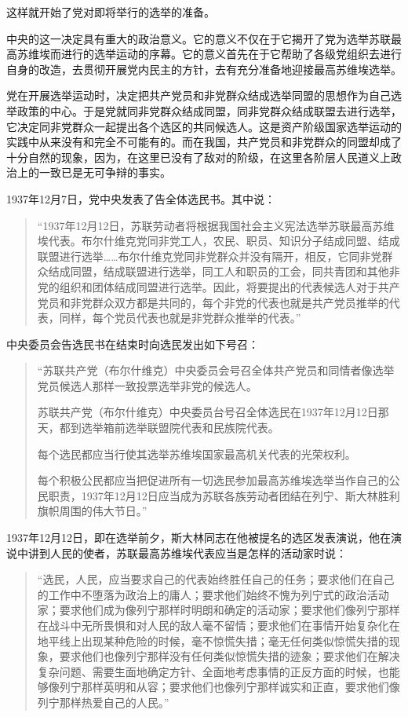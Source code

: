 这样就开始了党对即将举行的选举的准备。

中央的这一决定具有重大的政治意义。它的意义不仅在于它揭开了党为选举苏联最高苏维埃而进行的选举运动的序幕。它的意义首先在于它帮助了各级党组织去进行自身的改造，去贯彻开展党内民主的方针，去有充分准备地迎接最高苏维埃选举。

党在开展选举运动时，决定把共产党员和非党群众结成选举同盟的思想作为自己选举政策的中心。于是党就同非党群众结成同盟，同非党群众结成联盟去进行选举，它决定同非党群众一起提出各个选区的共同候选人。这是资产阶级国家选举运动的实践中从来没有和完全不可能有的。而在我国，共产党员和非党群众的同盟却成了十分自然的现象，因为，在这里已没有了敌对的阶级，在这里各阶层人民道义上政治上的一致已是无可争辩的事实。

1937年12月7日，党中央发表了告全体选民书。其中说：

\begin{quotation}
“1937年12月12日，苏联劳动者将根据我国社会主义宪法选举苏联最高苏维埃代表。布尔什维克党同非党工人，农民、职员、知识分子结成同盟、结成联盟进行选举……布尔什维克党同非党群众并没有隔开，相反，它同非党群众结成同盟，结成联盟进行选举，同工人和职员的工会，同共青团和其他非党的组织和团体结成同盟进行选举。因此，将要提出的代表候选人对于共产党员和非党群众双方都是共同的，每个非党的代表也就是共产党员推举的代表，同样，每个党员代表也就是非党群众推举的代表。”
\end{quotation}

中央委员会告选民书在结束时向选民发出如下号召：

\begin{quotation}
“苏联共产党（布尔什维克）中央委员会号召全体共产党员和同情者像选举党员候选人那样一致投票选举非党的候选人。

苏联共产党（布尔什维克）中央委员台号召全体选民在1937年12月12日那天，都到选举箱前选举联盟院代表和民族院代表。

每个选民都应当行使其选举苏维埃国家最高机关代表的光荣权利。

每个积极公民都应当把促进所有一切选民参加最高苏维埃选举当作自己的公民职责，1937年12月12日应当成为苏联各族劳动者团结在列宁、斯大林胜利旗帜周围的伟大节日。”
\end{quotation}

1937年12月12日，即在选举前夕，斯大林同志在他被提名的选区发表演说，他在演说中讲到人民的使者，苏联最高苏维埃代表应当是怎样的活动家时说：

\begin{quotation}
“选民，人民，应当要求自己的代表始终胜任自己的任务；要求他们在自己的工作中不堕落为政治上的庸人；要求他们始终不愧为列宁式的政治活动家；要求他们成为像列宁那样时明朗和确定的活动家；要求他们像列宁那样在战斗中无所畏惧和对人民的敌人毫不留情；要求他们在事情开始复杂化在地平线上出现某种危险的时候，毫不惊慌失措；毫无任何类似惊慌失措的现象，要求他们也像列宁那样没有任何类似惊慌失措的迹象；要求他们在解决复杂问题、需要生面地确定方针、全面地考虑事情的正反方面的时候，也能够像列宁那样英明和从容；要求他们也像列宁那样诚实和正直，要求他们像列宁那样热爱自己的人民。”
\end{quotation}

